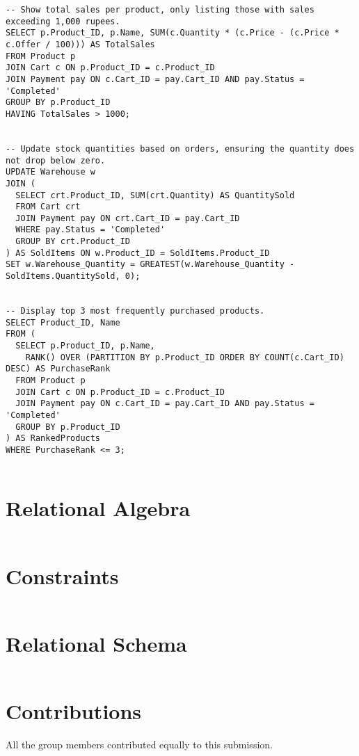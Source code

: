 \documentclass[12pt]{article}
\begin{document}
\begin{verbatim}
-- Show total sales per product, only listing those with sales exceeding 1,000 rupees.
SELECT p.Product_ID, p.Name, SUM(c.Quantity * (c.Price - (c.Price * c.Offer / 100))) AS TotalSales
FROM Product p
JOIN Cart c ON p.Product_ID = c.Product_ID
JOIN Payment pay ON c.Cart_ID = pay.Cart_ID AND pay.Status = 'Completed'
GROUP BY p.Product_ID
HAVING TotalSales > 1000;


-- Update stock quantities based on orders, ensuring the quantity does not drop below zero.
UPDATE Warehouse w
JOIN (
  SELECT crt.Product_ID, SUM(crt.Quantity) AS QuantitySold
  FROM Cart crt
  JOIN Payment pay ON crt.Cart_ID = pay.Cart_ID
  WHERE pay.Status = 'Completed'
  GROUP BY crt.Product_ID
) AS SoldItems ON w.Product_ID = SoldItems.Product_ID
SET w.Warehouse_Quantity = GREATEST(w.Warehouse_Quantity - SoldItems.QuantitySold, 0);


-- Display top 3 most frequently purchased products.
SELECT Product_ID, Name
FROM (
  SELECT p.Product_ID, p.Name,
    RANK() OVER (PARTITION BY p.Product_ID ORDER BY COUNT(c.Cart_ID) DESC) AS PurchaseRank
  FROM Product p
  JOIN Cart c ON p.Product_ID = c.Product_ID
  JOIN Payment pay ON c.Cart_ID = pay.Cart_ID AND pay.Status = 'Completed'
  GROUP BY p.Product_ID
) AS RankedProducts
WHERE PurchaseRank <= 3;


\end{verbatim}


\section*{Relational Algebra}

\begin{verbatim}

\end{verbatim}


\section*{Constraints}

\begin{verbatim}

\end{verbatim}


\section*{Relational Schema}

\begin{verbatim}

\end{verbatim}


\section*{Contributions}
All the group members contributed equally to this submission.
\end{document}

